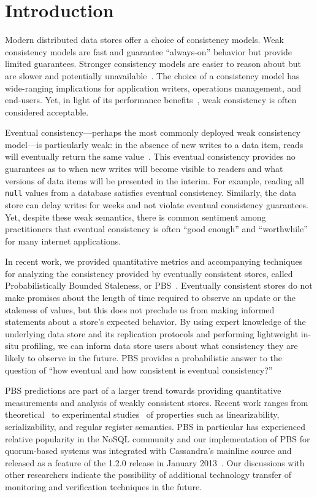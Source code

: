 \section{Introduction}

Modern distributed data stores offer a choice of consistency
models. Weak consistency models are fast and guarantee ``always-on''
behavior but provide limited guarantees. Stronger consistency models
are easier to reason about but are slower and potentially
unavailable~\cite{davidson-survey}. The choice of a consistency model
has wide-ranging implications for application writers, operations
management, and end-users.  Yet, in light of its performance
benefits~\cite{abadi-pacelc}, weak consistency is often considered
acceptable.

Eventual consistency---perhaps the most commonly deployed weak
consistency model---is particularly weak: in the absence of new writes
to a data item, reads will eventually return the same
value~\cite{vogels-defs}. This eventual consistency provides no
guarantees as to when new writes will become visible to readers and
what versions of data items will be presented in the
interim. For example, reading all \texttt{null}
values from a database satisfies eventual consistency. Similarly, the
data store can delay writes for weeks and not violate eventual
consistency guarantees. Yet, despite these weak semantics, there is
common sentiment among practitioners that eventual consistency is
often ``good enough'' and ``worthwhile'' for many internet
applications.

In recent work, we provided quantitative metrics and accompanying
techniques for analyzing the consistency provided by eventually
consistent stores, called Probabilistically Bounded Staleness, or
PBS~\cite{pbs-vldb2012}. Eventually consistent stores do not make
promises about the length of time required to observe an update or the
staleness of values, but this does not preclude us from making
informed statements about a store's expected behavior. By using expert
knowledge of the underlying data store and its replication protocols
and performing lightweight in-situ profiling, we can inform data store
users about what consistency they are likely to observe in the
future. PBS provides a probabilistic answer to the question of
``how eventual and how consistent is eventual consistency?''

PBS predictions are part of a larger trend towards providing
quantitative measurements and analysis of weakly consistent
stores. Recent work ranges from theoretical~\cite{podc-hpl} to
experimental studies~\cite{hotdep} of properties such as linearizability,
serializability, and regular register semantics. PBS in particular has
experienced relative popularity in the NoSQL community and our
implementation of PBS for quorum-based systems was integrated with
Cassandra's mainline source and released as a feature of the 1.2.0
release in January 2013~\cite{cassandra-pbs-patch}. Our discussions
with other researchers indicate the possibility of additional
technology transfer of monitoring and verification techniques in the
future.

